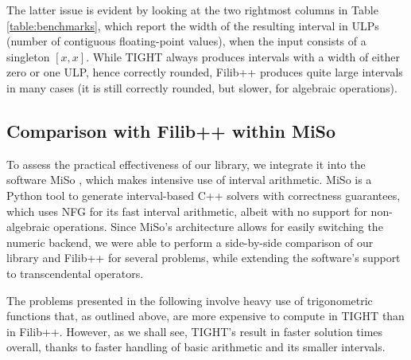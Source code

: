 The latter issue is evident by looking at the two rightmost columns in Table \ref{table:benchmarks}, which report the width of the resulting interval in ULPs (number of contiguous floating-point values), when the input consists of a singleton $[x,x]$.
While TIGHT always produces intervals with a width of either zero or one ULP, hence correctly rounded, Filib++ produces quite large intervals in many cases (it is still correctly rounded, but slower, for algebraic operations). 



\subsection{Comparison with Filib++ within MiSo}
To assess the practical effectiveness of our library, we integrate it into the software MiSo \cite{Sichetti2025}, which makes intensive use of interval arithmetic.
MiSo is a Python tool to generate interval-based C++ solvers with correctness guarantees, which uses NFG for its fast interval arithmetic, albeit with no support for non-algebraic operations.
Since MiSo's architecture allows for easily switching the numeric backend, we were able to perform a side-by-side comparison of our library and Filib++ for several problems, while extending the software's support to transcendental operators.

The problems presented in the following involve heavy use of trigonometric functions that, as outlined above, are more expensive to compute in TIGHT than in Filib++.
However, as we shall see, TIGHT's result in faster solution times overall, thanks to faster handling of basic arithmetic and its smaller intervals.

